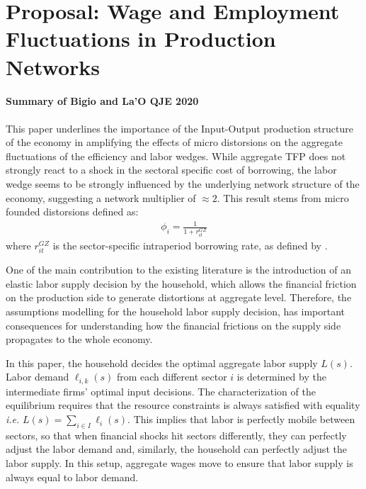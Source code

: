 \documentclass[english,letter,11pt,twoside]{article}
\begin{document}
\clearpage

\section*{Proposal: Wage and Employment Fluctuations in Production Networks}

\paragraph*{Summary of Bigio and La'O QJE 2020}

This paper underlines the importance of the Input-Output production structure of the economy in amplifying the effects of micro distorsions on the aggregate fluctuations of the efficiency and labor wedges. While aggregate TFP does not strongly react to a shock in the sectoral specific cost of borrowing, the labor wedge seems to be strongly influenced by the underlying network structure of the economy, suggesting a network multiplier of $\approx 2$. This result stems from micro founded distorsions defined as:
\begin{align*}
\phi_i = \frac{1}{1 + r^{GZ}_{it}}
\end{align*}
where $r^{GZ}_{it}$ is the sector-specific intraperiod borrowing rate, as defined by \cite{gilchrist2012credit}. 

One of the main contribution to the existing literature is the introduction of an elastic labor supply decision by the household, which allows the financial friction on the production side to generate distortions at aggregate level. Therefore, the assumptions modelling for the household labor supply decision, has important consequences for understanding how the financial frictions on the supply side propagates to the whole economy. 

In this paper, the household decides the optimal aggregate labor supply $L(s)$. Labor demand $\ell_{i,k}(s)$ from each different sector $i$ is determined by the intermediate firms' optimal input decisions. The characterization of the equilibrium requires that the resource constraints is always satisfied with equality \textit{i.e.} $L(s) = \sum_{i \in I} \ell_i(s)$. This implies that labor is perfectly mobile between sectors, so that when financial shocks hit sectors differently, they can perfectly adjust the labor demand and, similarly, the household can perfectly adjust the labor supply. In this setup, aggregate wages move to ensure that labor supply is always equal to labor demand.
\end{document}
